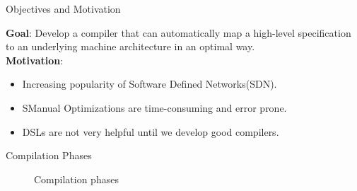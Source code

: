 \documentclass[final]{beamer}
\newlength{\onecolwid}
\begin{document}
\begin{frame}
\begin{columns}[t]
\begin{column}{\onecolwid}
\begin{exampleblock}{Objectives and Motivation}

\textbf{Goal}: Develop a compiler that can automatically map a high-level specification to an underlying machine architecture in an optimal way.\\
\textbf{Motivation}:
\begin{itemize}
\item Increasing popularity of Software Defined Networks(SDN).
\item SManual Optimizations are time-consuming and error prone.
\item DSLs are not very helpful until we develop good compilers.
\end{itemize}

\end{exampleblock}


\begin{exampleblock}{Compilation Phases}


\begin{figure}
\caption{Compilation phases}
\end{figure}


\end{exampleblock}



\end{column}
\end{columns}
\end{frame}
\end{document}
